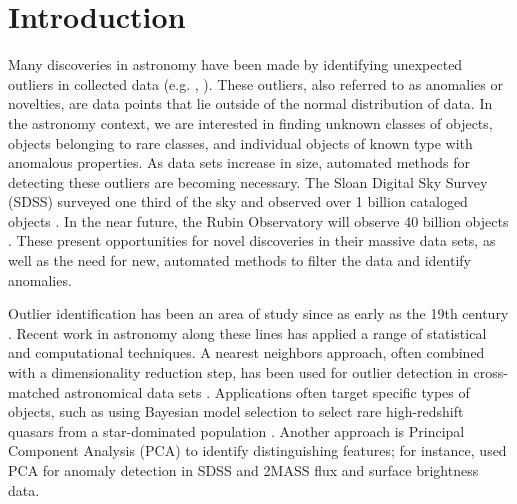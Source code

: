 \section{Introduction}

Many discoveries in astronomy have been made by identifying unexpected outliers in collected data (e.g. \citealt{Cardamone2009}, \citealt{Massey2019}). 
These outliers, also referred to as anomalies or novelties, are data points that lie outside of the normal distribution of data.
In the astronomy context, we are interested in finding unknown classes of objects, objects belonging to rare classes, and individual objects of known type with anomalous properties.
As data sets increase in size, automated methods for detecting these outliers are becoming necessary.
The Sloan Digital Sky Survey (SDSS) surveyed one third of the sky and observed over 1 billion cataloged objects \citep{York2000}.
In the near future, the Rubin Observatory will observe 40 billion objects \citep{Ivezic2018}.
These present opportunities for novel discoveries in their massive data sets, as well as the need for new, automated methods to filter the data and identify anomalies.

Outlier identification has been an area of study since as early as the 19th century \citep{Edgeworth1887}.
Recent work in astronomy along these lines has applied a range of statistical and computational techniques.
A nearest neighbors approach, often combined with a dimensionality reduction step, has been used for outlier detection in cross-matched astronomical data sets \citep{Henrion2013}.
Applications often target specific types of objects, such as using Bayesian model selection to select rare high-redshift quasars from a star-dominated population \citep{Mortlock2012}.
Another approach is Principal Component Analysis (PCA) to identify distinguishing features; for instance, \cite{Dutta2007} used PCA for anomaly detection in SDSS and 2MASS flux and surface brightness data.

